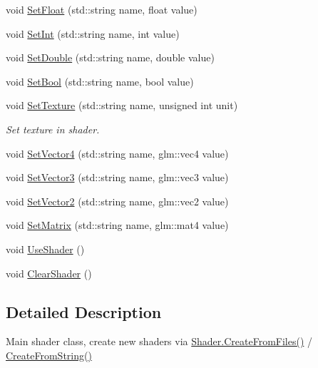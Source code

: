 \begin{DoxyCompactItemize}
\item 
void \mbox{\hyperlink{class_shader_adf47ae73e99fb8d8c46facf3eec495d2}{Set\+Float}} (std\+::string name, float value)
\item 
void \mbox{\hyperlink{class_shader_a5771e447d15d0f338ebbd03054c2f4d5}{Set\+Int}} (std\+::string name, int value)
\item 
void \mbox{\hyperlink{class_shader_aa7ec944e22ea137fe404db211ca93c49}{Set\+Double}} (std\+::string name, double value)
\item 
void \mbox{\hyperlink{class_shader_a1748c0c01d58bd7de586cfefc02a54ed}{Set\+Bool}} (std\+::string name, bool value)
\item 
\mbox{\label{class_shader_a4cb2a0a8f3d9f201c0c21e4933368f59}} 
void \mbox{\hyperlink{class_shader_a4cb2a0a8f3d9f201c0c21e4933368f59}{Set\+Texture}} (std\+::string name, unsigned int unit)
\begin{DoxyCompactList}\small\item\em Set texture in shader. \end{DoxyCompactList}\item 
void \mbox{\hyperlink{class_shader_a43443ff13fc01862d40930b6a6d312b3}{Set\+Vector4}} (std\+::string name, glm\+::vec4 value)
\item 
void \mbox{\hyperlink{class_shader_aa9d9c1159e1ebaf60d09d4763523efd3}{Set\+Vector3}} (std\+::string name, glm\+::vec3 value)
\item 
void \mbox{\hyperlink{class_shader_a0d918646fca62689f9b26061c94c22e5}{Set\+Vector2}} (std\+::string name, glm\+::vec2 value)
\item 
void \mbox{\hyperlink{class_shader_a6ef140964c1712d1eedec953ff5b7aae}{Set\+Matrix}} (std\+::string name, glm\+::mat4 value)
\item 
void \mbox{\hyperlink{class_shader_a08706ac2b4375d3bb7a6b38db0369f44}{Use\+Shader}} ()
\item 
void \mbox{\hyperlink{class_shader_a25a9f9268ff04308572a27518eaec2f5}{Clear\+Shader}} ()
\end{DoxyCompactItemize}


\subsection{Detailed Description}
Main shader class, create new shaders via \mbox{\hyperlink{class_shader_aeca0f4f24d2d7e2ac5fda22bca6e21c5}{Shader.\+Create\+From\+Files()}} / \mbox{\hyperlink{class_shader_a099eeffb7a893ab69cc34b70faed9d3b}{Create\+From\+String()}} 

